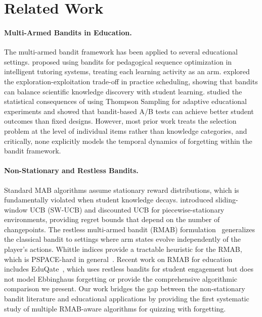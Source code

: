 \section{Related Work}
\label{sec:related}
\vspace{-1mm}

\paragraph{Multi-Armed Bandits in Education.}
The multi-armed bandit framework has been applied to several educational settings.
\citet{clement2015multi} proposed using bandits for pedagogical sequence optimization in intelligent tutoring systems, treating each learning activity as an arm.
\citet{liu2014trading} explored the exploration-exploitation trade-off in practice scheduling, showing that bandits can balance scientific knowledge discovery with student learning.
\citet{rafferty2019statistical} studied the statistical consequences of using Thompson Sampling for adaptive educational experiments and showed that bandit-based A/B tests can achieve better student outcomes than fixed designs.
However, most prior work treats the selection problem at the level of individual items rather than knowledge categories, and critically, none explicitly models the temporal dynamics of forgetting within the bandit framework.

\paragraph{Non-Stationary and Restless Bandits.}
Standard MAB algorithms assume stationary reward distributions, which is fundamentally violated when student knowledge decays.
\citet{garivier2011upper} introduced sliding-window UCB (SW-UCB) and discounted UCB for piecewise-stationary environments, providing regret bounds that depend on the number of changepoints.
The restless multi-armed bandit (RMAB) formulation~\citep{whittle1988restless} generalizes the classical bandit to settings where arm states evolve independently of the player's actions.
Whittle indices provide a tractable heuristic for the RMAB, which is PSPACE-hard in general~\citep{papadimitriou1999complexity}.
Recent work on RMAB for education includes EduQate~\citep{mate2024eduqate}, which uses restless bandits for student engagement but does not model Ebbinghaus forgetting or provide the comprehensive algorithmic comparison we present.
Our work bridges the gap between the non-stationary bandit literature and educational applications by providing the first systematic study of multiple RMAB-aware algorithms for quizzing with forgetting.

